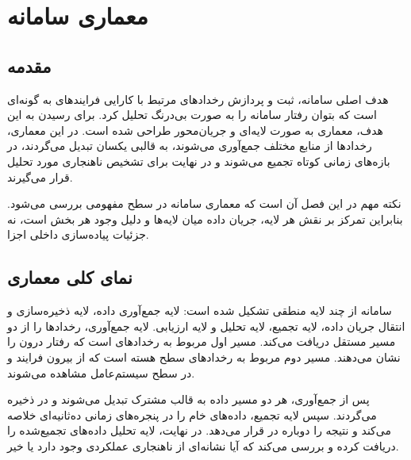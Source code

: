 \chapter{معماری سامانه}

\section{مقدمه}
هدف اصلی سامانه، ثبت و پردازش رخدادهای مرتبط با کارایی فرایندهای  به گونه‌ای است که بتوان رفتار سامانه را به صورت بی‌درنگ تحلیل کرد. برای رسیدن به این هدف، معماری به صورت لایه‌ای و جریان‌محور طراحی شده است. در این معماری، رخدادها از منابع مختلف جمع‌آوری می‌شوند، به قالبی یکسان تبدیل می‌گردند، در بازه‌های زمانی کوتاه تجمیع می‌شوند و در نهایت برای تشخیص ناهنجاری مورد تحلیل قرار می‌گیرند.

نکته مهم در این فصل آن است که معماری سامانه در سطح مفهومی بررسی می‌شود. بنابراین تمرکز بر نقش هر لایه، جریان داده میان لایه‌ها و دلیل وجود هر بخش است، نه جزئیات پیاده‌سازی داخلی اجزا.

\section{نمای کلی معماری}
سامانه از چند لایه منطقی تشکیل شده است: لایه جمع‌آوری داده، لایه ذخیره‌سازی و انتقال جریان داده، لایه تجمیع، لایه تحلیل و لایه ارزیابی. لایه جمع‌آوری، رخدادها را از دو مسیر مستقل دریافت می‌کند. مسیر اول مربوط به رخدادهای  است که رفتار درون  را نشان می‌دهند. مسیر دوم مربوط به رخدادهای سطح هسته است که از بیرون فرایند و در سطح سیستم‌عامل مشاهده می‌شوند.

پس از جمع‌آوری، هر دو مسیر داده به قالب مشترک تبدیل می‌شوند و در  ذخیره می‌گردند. سپس لایه تجمیع، داده‌های خام را در پنجره‌های زمانی ده‌ثانیه‌ای خلاصه می‌کند و نتیجه را دوباره در  قرار می‌دهد. در نهایت، لایه تحلیل داده‌های تجمیع‌شده را دریافت کرده و بررسی می‌کند که آیا نشانه‌ای از ناهنجاری عملکردی وجود دارد یا خیر.

